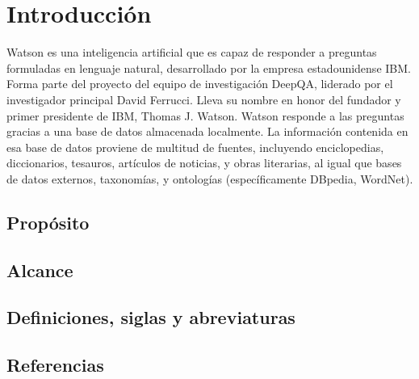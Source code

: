 \chapter{Introducción}
Watson es una inteligencia artificial que es capaz de responder a preguntas formuladas en lenguaje natural, desarrollado por la empresa estadounidense IBM. Forma parte del proyecto del equipo de investigación DeepQA, liderado por el investigador principal David Ferrucci. Lleva su nombre en honor del fundador y primer presidente de IBM, Thomas J. Watson.
Watson responde a las preguntas gracias a una base de datos almacenada localmente. La información contenida en esa base de datos proviene de multitud de fuentes, incluyendo enciclopedias, diccionarios, tesauros, artículos de noticias, y obras literarias, al igual que bases de datos externos, taxonomías, y ontologías (específicamente DBpedia, WordNet).

\section{Propósito}


\section{Alcance}

\section{Definiciones, siglas y abreviaturas}

\section{Referencias}
